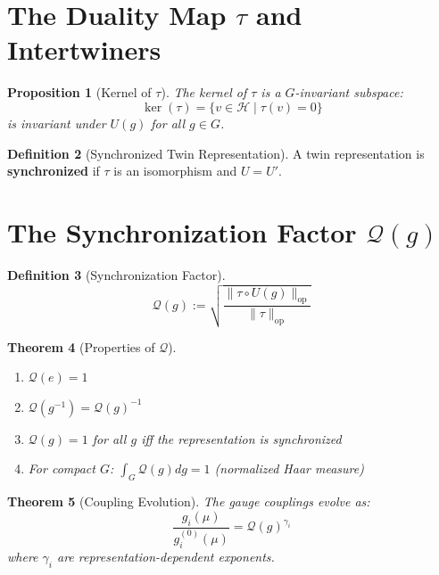 \documentclass[11pt,a4paper,openright]{book}
\theoremstyle{plain}
\newtheorem{theorem}{Theorem}[chapter]
\newtheorem{proposition}[theorem]{Proposition}
\theoremstyle{definition}
\newtheorem{definition}[theorem]{Definition}
\newcommand{\Hil}{\mathcal{H}}
\newcommand{\op}{\mathrm{op}}
\begin{document}
\section{The Duality Map $\tau$ and Intertwiners}

\begin{proposition}[Kernel of $\tau$]
The kernel of $\tau$ is a $G$-invariant subspace:
\begin{equation}
\ker(\tau) = \{v \in \Hil \mid \tau(v) = 0\}
\end{equation}
is invariant under $U(g)$ for all $g \in G$.
\end{proposition}

\begin{definition}[Synchronized Twin Representation]
A twin representation is \textbf{synchronized} if $\tau$ is an isomorphism and $U = U'$.
\end{definition}

\section{The Synchronization Factor $\mathcal{Q}(g)$}

\begin{definition}[Synchronization Factor]
\begin{equation}
\mathcal{Q}(g) := \sqrt{\frac{\|\tau \circ U(g)\|_{\op}}{\|\tau\|_{\op}}}
\end{equation}
\end{definition}

\begin{theorem}[Properties of $\mathcal{Q}$]
\begin{enumerate}[label=(\roman*)]
    \item $\mathcal{Q}(e) = 1$
    \item $\mathcal{Q}(g^{-1}) = \mathcal{Q}(g)^{-1}$
    \item $\mathcal{Q}(g) = 1$ for all $g$ iff the representation is synchronized
    \item For compact $G$: $\int_G \mathcal{Q}(g) dg = 1$ (normalized Haar measure)
\end{enumerate}
\end{theorem}

\begin{theorem}[Coupling Evolution]
The gauge couplings evolve as:
\begin{equation}
\frac{g_i(\mu)}{g_i^{(0)}(\mu)} = \mathcal{Q}(g)^{\gamma_i}
\end{equation}
where $\gamma_i$ are representation-dependent exponents.
\end{theorem}
\end{document}
